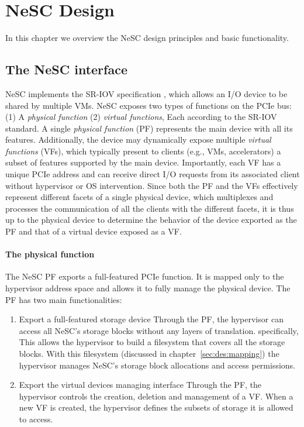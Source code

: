 \chapter{NeSC Design}
\label{chap:design}

In this chapter we overview the NeSC design principles and basic functionality. 

\section{The NeSC interface}
NeSC implements the SR-IOV specification \cite{pcisigiov}, which allows an I/O device to be shared by multiple VMs.
NeSC exposes two types of functions on the PCIe bus: (1) A \emph{physical function} (2) \emph{ virtual functions}, Each according to the SR-IOV standard.
A single \emph{physical function} (PF) represents the main device with all its features. Additionally, the device may dynamically expose multiple \emph{virtual functions} (VFs), which typically present to clients (e.g., VMs, accelerators) a subset of features supported by the main device. Importantly, each VF has a unique PCIe address and can receive direct I/O requests from its associated client without hypervisor or OS intervention.
%
Since both the PF and the VFs effectively represent different facets of a single physical device, which multiplexes and processes the communication of all the clients with the different facets, it is thus up to the physical device to determine the behavior of the device exported as the PF and that of a virtual device exposed as a VF.

\subsubsection*{The physical function}
The NeSC PF exports a full-featured PCIe function. It is mapped only to the hypervisor address space and allows it to fully manage the physical  device.
The PF has two main functionalities:
  
\begin{enumerate}
\item Export a full-featured storage device \quad
  Through the PF, the hypervisor can access all NeSC's storage blocks without any layers of 
  translation. specifically, This allows the hypervisor to build a filesystem that covers all
  the storage blocks. With this filesystem (discussed in chapter~\ref{sec:des:mapping}) the
  hypervisor manages NeSC's storage block allocations and access permissions.

\item Export the virtual devices managing interface \quad
  Through the PF, the hypervisor controls the creation, deletion and management of a VF.
  When a new VF is created, the hypervisor defines the subsets of storage it is allowed to access.

\end{enumerate}

